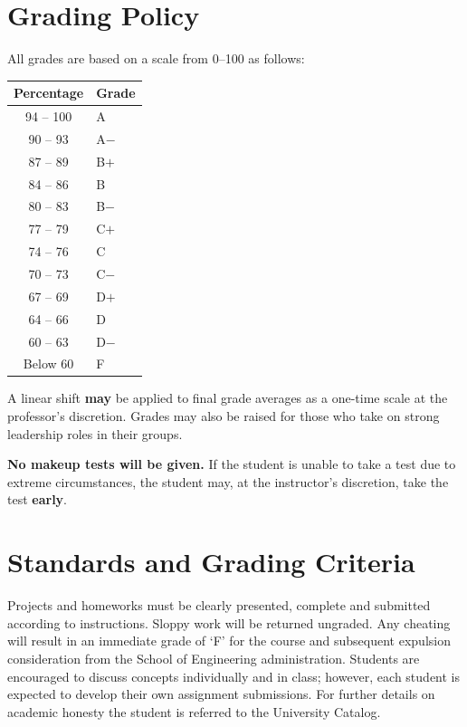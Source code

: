 \documentclass[11pt]{article}
\begin{document}
\section*{Grading Policy}

All grades are based on a scale from 0--100 as follows:

\begin{center}
\begin{tabular}{cl}
\toprule
\textbf{Percentage} & \textbf{Grade} \\
\midrule
94 -- 100 & A \\
90 -- 93 & A$-$ \\
87 -- 89 & B$+$ \\
84 -- 86 & B \\
80 -- 83 & B$-$ \\
77 -- 79 & C$+$ \\
74 -- 76 & C \\
70 -- 73 & C$-$ \\
67 -- 69 & D$+$ \\
64 -- 66 & D \\
60 -- 63 & D$-$ \\
Below 60 & F \\
\bottomrule
\end{tabular}
\end{center}

A linear shift \textbf{may} be applied to final grade averages as a one-time scale at the professor's discretion. Grades may also be raised for those who take on strong leadership roles in their groups.

\textbf{No makeup tests will be given.} If the student is unable to take a test due to extreme circumstances, the student may, at the instructor's discretion, take the test \textbf{early}.

\section*{Standards and Grading Criteria}

Projects and homeworks must be clearly presented, complete and submitted according to instructions. Sloppy work will be returned ungraded. Any cheating will result in an immediate grade of `F' for the course and subsequent expulsion consideration from the School of Engineering administration. Students are encouraged to discuss concepts individually and in class; however, each student is expected to develop their own assignment submissions. For further details on academic honesty the student is referred to the University Catalog.
\end{document}
